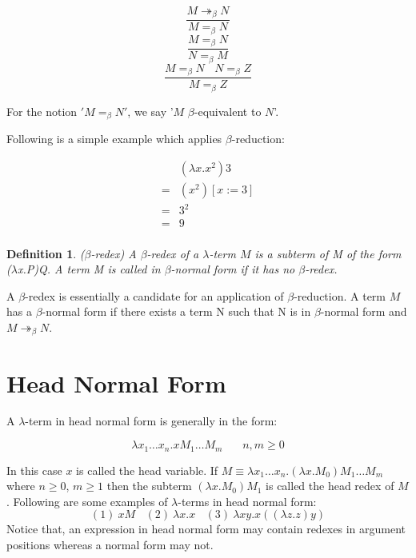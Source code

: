 \documentclass[a4paper,11pt,twoside]{report}
\newtheorem{def1}{\textbf{Definition}}[chapter]
\begin{document}
\begin{equation*}
\frac{M\twoheadrightarrow _\beta N}{M = _\beta N}
\end{equation*}
\begin{equation*}
\frac{M = _\beta N}{N = _\beta M}
\end{equation*}
\begin{equation*}
\frac{M = _\beta N\ \ \ \ N = _\beta Z}{M = _\beta Z}
\end{equation*}

For the notion $'M = _\beta N'$, we say '$M$ $\beta$-equivalent to $N$'. 

\noindent Following is a simple example which applies $\beta$-reduction:

\begin{equation*}
\begin{array}{ll}
&(\lambda x.x^2)3\\
=& (x^2)[x:=3] \\
=& 3^2 \\
=&9 \\
\end{array}
\end{equation*}


\begin{def1}
($\beta$-redex) A $\beta$-redex of a $\lambda$-term $M$ is a subterm of M of the form ($\lambda$x.P)Q. A term M is called in $\beta$-normal form if it has no $\beta$-redex.
\end{def1}
A $\beta$-redex is essentially a candidate for an application of $\beta$-reduction. A term $M$ has a $\beta$-normal form if there exists a term N such that N is in $\beta$-normal form and $M \twoheadrightarrow _\beta N$. 

\section{Head Normal Form}

\noindent A $\lambda$-term in head normal form is generally in the form:

\begin{equation*}
\lambda x_1\ldots x_n.xM_1\ldots M_m\ \ \ \ \ \ \ \ n,m\geqslant 0
\end{equation*}

In this case $x$ is called the head variable. If $M \equiv \lambda x_1\ldots x_n.(\lambda x.M_0)M_1\ldots M_m$ where $n\geqslant 0$, $m\geqslant 1$ then the subterm $(\lambda x.M_0)M_1$ is called the head redex of $M$. Following are some examples of $\lambda$-terms in head normal form:
\begin{equation*}
(1)\ xM\ \ \ \ (2)\ \lambda x.x\ \ \ \ (3)\ \lambda xy.x((\lambda z.z)y)
\end{equation*}
Notice that, an expression in head normal form may contain redexes in argument positions whereas a normal form may not.
\end{document}
